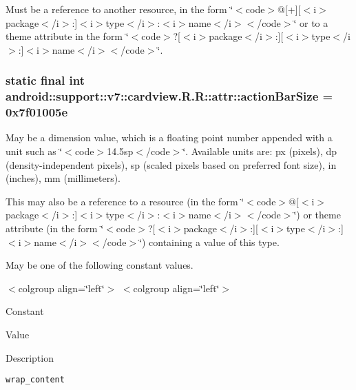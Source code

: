 Must be a reference to another resource, in the form \char`\"{}$<$code$>$@\mbox{[}+\mbox{]}\mbox{[}$<$i$>$package$<$/i$>$:\mbox{]}$<$i$>$type$<$/i$>$:$<$i$>$name$<$/i$>$$<$/code$>$\char`\"{} or to a theme attribute in the form \char`\"{}$<$code$>$?\mbox{[}$<$i$>$package$<$/i$>$:\mbox{]}\mbox{[}$<$i$>$type$<$/i$>$:\mbox{]}$<$i$>$name$<$/i$>$$<$/code$>$\char`\"{}. \hypertarget{classandroid_1_1support_1_1v7_1_1cardview_1_1_r_1_1attr_d48245218b6390d01ed044af97b49ee4}{
\subsubsection[{actionBarSize}]{\setlength{\rightskip}{0pt plus 5cm}static final int android::support::v7::cardview.R.R::attr::actionBarSize = 0x7f01005e}}
\label{classandroid_1_1support_1_1v7_1_1cardview_1_1_r_1_1attr_d48245218b6390d01ed044af97b49ee4}


May be a dimension value, which is a floating point number appended with a unit such as \char`\"{}$<$code$>$14.5sp$<$/code$>$\char`\"{}. Available units are: px (pixels), dp (density-independent pixels), sp (scaled pixels based on preferred font size), in (inches), mm (millimeters). 

This may also be a reference to a resource (in the form \char`\"{}$<$code$>$@\mbox{[}$<$i$>$package$<$/i$>$:\mbox{]}$<$i$>$type$<$/i$>$:$<$i$>$name$<$/i$>$$<$/code$>$\char`\"{}) or theme attribute (in the form \char`\"{}$<$code$>$?\mbox{[}$<$i$>$package$<$/i$>$:\mbox{]}\mbox{[}$<$i$>$type$<$/i$>$:\mbox{]}$<$i$>$name$<$/i$>$$<$/code$>$\char`\"{}) containing a value of this type. 

May be one of the following constant values. \begin{TabularC}{0}
\hline
\end{TabularC}
$<$colgroup align=\char`\"{}left\char`\"{}$>$ $<$colgroup align=\char`\"{}left\char`\"{}$>$ 

Constant

Value

Description 

{\tt wrap\_\-content}

